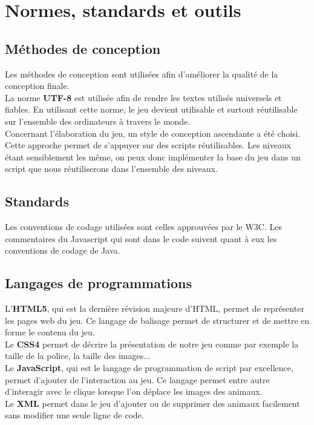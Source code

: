 \documentclass{article}
\begin{document}
\section{Normes, standards et outils}

\subsection{Méthodes de conception}
\hspace*{0.6cm}Les méthodes de conception sont utilisées afin d'améliorer la qualité de la conception finale.
\vspace{0.5cm}\\
\hspace*{0.6cm}La norme \textbf{UTF-8} est utilisée afin de rendre les textes utilisés universels et fiables. En utilisant cette norme, le jeu devient utilisable et surtout réutilisable sur l'ensemble des ordinateurs à travers le monde.
\vspace{0.5cm}\\
\hspace*{0.6cm}Concernant l'élaboration du jeu, un style de conception ascendante a été choisi. Cette approche permet de s'appuyer sur des scripts réutilisables. Les niveaux étant sensiblement les même, on peux donc implémenter la base du jeu dans un script que nous réutiliserons dans l'ensemble des niveaux.

\subsection{Standards}

\hspace*{0.6cm}Les conventions de codage utilisées sont celles approuvées par le W3C. Les commentaires du Javascript qui sont dans le code suivent quant à eux les conventions de codage de Java.

\subsection{Langages de programmations}

\hspace*{0.6cm}L'\textbf{HTML5}, qui est la dernière révision majeure d'HTML, permet de représenter les pages web du jeu. Ce langage de balisage permet de structurer et de mettre en forme le contenu du jeu.\\
\hspace*{0.6cm}Le \textbf{CSS4} permet de décrire la présentation de notre jeu comme par exemple la taille de la police, la taille des images...\\
\hspace*{0.6cm}Le \textbf{JavaScript}, qui est le langage de programmation de script par excellence, permet d'ajouter de l'interaction au jeu. Ce langage permet entre autre d'interagir avec le clique lorsque l'on déplace les images des animaux.\\
\hspace*{0.6cm}Le \textbf{XML} permet dans le jeu d'ajouter ou de supprimer des animaux facilement sans modifier une seule ligne de code.
\end{document}
